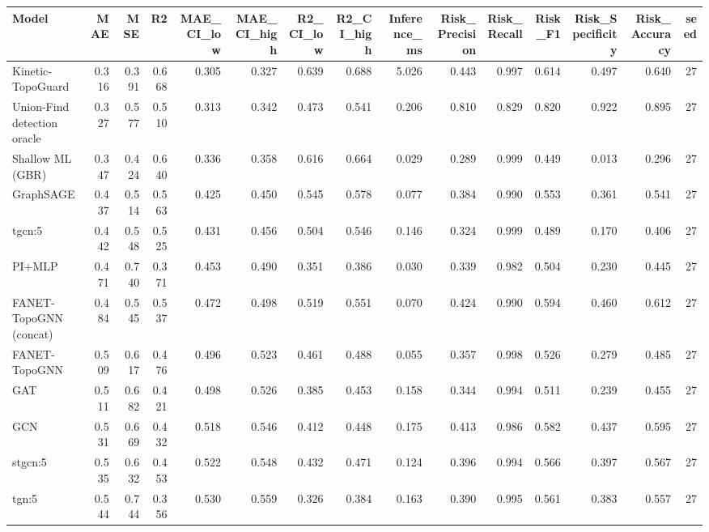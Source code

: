 \begin{tabular}{lrrrrrrrrrrrrrr}
\toprule
Model & MAE & MSE & R2 & MAE\_CI\_low & MAE\_CI\_high & R2\_CI\_low & R2\_CI\_high & Inference\_ms & Risk\_Precision & Risk\_Recall & Risk\_F1 & Risk\_Specificity & Risk\_Accuracy & seed \\
\midrule
Kinetic-TopoGuard & 0.316 & 0.391 & 0.668 & 0.305 & 0.327 & 0.639 & 0.688 & 5.026 & 0.443 & 0.997 & 0.614 & 0.497 & 0.640 & 27 \\
Union-Find detection oracle & 0.327 & 0.577 & 0.510 & 0.313 & 0.342 & 0.473 & 0.541 & 0.206 & 0.810 & 0.829 & 0.820 & 0.922 & 0.895 & 27 \\
Shallow ML (GBR) & 0.347 & 0.424 & 0.640 & 0.336 & 0.358 & 0.616 & 0.664 & 0.029 & 0.289 & 0.999 & 0.449 & 0.013 & 0.296 & 27 \\
GraphSAGE & 0.437 & 0.514 & 0.563 & 0.425 & 0.450 & 0.545 & 0.578 & 0.077 & 0.384 & 0.990 & 0.553 & 0.361 & 0.541 & 27 \\
tgcn:5 & 0.442 & 0.548 & 0.525 & 0.431 & 0.456 & 0.504 & 0.546 & 0.146 & 0.324 & 0.999 & 0.489 & 0.170 & 0.406 & 27 \\
PI+MLP & 0.471 & 0.740 & 0.371 & 0.453 & 0.490 & 0.351 & 0.386 & 0.030 & 0.339 & 0.982 & 0.504 & 0.230 & 0.445 & 27 \\
FANET-TopoGNN (concat) & 0.484 & 0.545 & 0.537 & 0.472 & 0.498 & 0.519 & 0.551 & 0.070 & 0.424 & 0.990 & 0.594 & 0.460 & 0.612 & 27 \\
FANET-TopoGNN & 0.509 & 0.617 & 0.476 & 0.496 & 0.523 & 0.461 & 0.488 & 0.055 & 0.357 & 0.998 & 0.526 & 0.279 & 0.485 & 27 \\
GAT & 0.511 & 0.682 & 0.421 & 0.498 & 0.526 & 0.385 & 0.453 & 0.158 & 0.344 & 0.994 & 0.511 & 0.239 & 0.455 & 27 \\
GCN & 0.531 & 0.669 & 0.432 & 0.518 & 0.546 & 0.412 & 0.448 & 0.175 & 0.413 & 0.986 & 0.582 & 0.437 & 0.595 & 27 \\
stgcn:5 & 0.535 & 0.632 & 0.453 & 0.522 & 0.548 & 0.432 & 0.471 & 0.124 & 0.396 & 0.994 & 0.566 & 0.397 & 0.567 & 27 \\
tgn:5 & 0.544 & 0.744 & 0.356 & 0.530 & 0.559 & 0.326 & 0.384 & 0.163 & 0.390 & 0.995 & 0.561 & 0.383 & 0.557 & 27 \\
\bottomrule
\end{tabular}